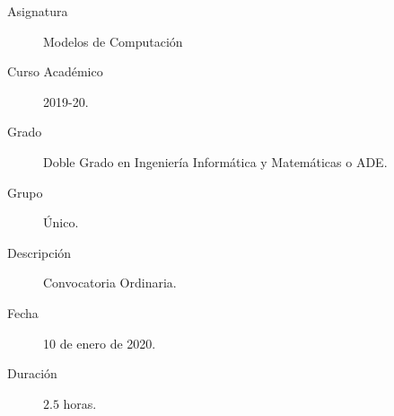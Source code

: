 \documentclass[12pt]{article}
\begin{document}

    
    

    \begin{description}
        \item[Asignatura] Modelos de Computación
        \item[Curso Académico] 2019-20.
        \item[Grado] Doble Grado en Ingeniería Informática y Matemáticas o ADE.
        \item[Grupo] Único.
        \item[Descripción] Convocatoria Ordinaria.
        \item[Fecha] 10 de enero de 2020.
        \item[Duración] $2.5$ horas.    
    \end{description}
    \newpage
\end{document}
